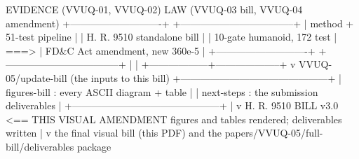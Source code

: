 \documentclass[11pt]{article}
\begin{document}
\begin{asciifig}
  EVIDENCE (VVUQ-01, VVUQ-02)         LAW (VVUQ-03 bill, VVUQ-04 amendment)
  +----------------------------+      +-----------------------------------+
  | method + 51-test pipeline  |      | H. R. 9510 standalone bill        |
  | 10-gate humanoid, 172 test | ===> | FD&C Act amendment, new 360e-5    |
  +----------------------------+      +-----------------------------------+
               |                                       |
               +------------------+--------------------+
                                  v
             VVUQ-05/update-bill  (the inputs to this bill)
             +---------------------------------------------+
             | figures-bill : every ASCII diagram + table  |
             | next-steps   : the submission deliverables  |
             +---------------------------------------------+
                                  |
                                  v
            H. R. 9510 BILL v3.0  <== THIS VISUAL AMENDMENT
            figures and tables rendered; deliverables written
                                  |
                                  v
            the final visual bill (this PDF) and the
            papers/VVUQ-05/full-bill/deliverables package
\end{asciifig}

\clearpage
{}

\label{toc:s1}


\end{document}
